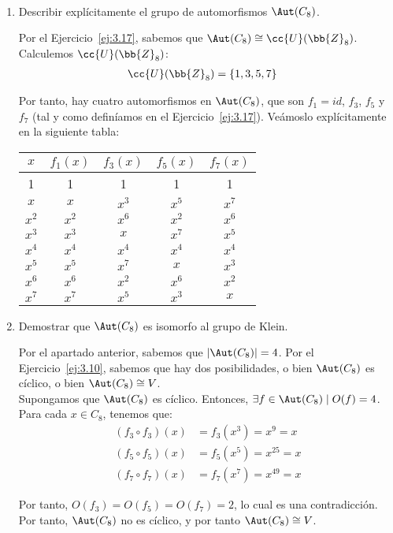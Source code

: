 \begin{ejercicio}\label{ej:3.18}~
    \begin{enumerate}
        \item Describir explícitamente el grupo de automorfismos $\Aut(C_8)$.
        
        Por el Ejercicio~\ref{ej:3.17}, sabemos que $\Aut(C_8)\cong \cc{U}(\bb{Z}_8)$. Calculemos $\cc{U}(\bb{Z}_8)$:
        \begin{align*}
            \cc{U}(\bb{Z}_8) &= \{1,3,5,7\}
        \end{align*}

        Por tanto, hay cuatro automorfismos en $\Aut(C_8)$, que son $f_1=id$, $f_3$, $f_5$ y $f_7$ (tal y como definíamos en el Ejercicio~\ref{ej:3.17}). Veámoslo explícitamente en la siguiente tabla:
        \begin{table}[H]
            \centering
            \begin{tabular}{c|c|c|c|c}
                $x$ & $f_1(x)$ & $f_3(x)$ & $f_5(x)$ & $f_7(x)$\\
                \hline
                1 & 1 & 1 & 1 & 1\\
                $x$ & $x$ & $x^3$ & $x^5$ & $x^7$\\
                $x^2$ & $x^2$ & $x^6$ & $x^2$ & $x^6$\\
                $x^3$ & $x^3$ & $x$ & $x^7$ & $x^5$\\
                $x^4$ & $x^4$ & $x^4$ & $x^4$ & $x^4$\\
                $x^5$ & $x^5$ & $x^7$ & $x$ & $x^3$\\
                $x^6$ & $x^6$ & $x^2$ & $x^6$ & $x^2$\\
                $x^7$ & $x^7$ & $x^5$ & $x^3$ & $x$
            \end{tabular}
        \end{table}
        
        \item Demostrar que $\Aut(C_8)$ es isomorfo al grupo de Klein.
        
        Por el apartado anterior, sabemos que $|\Aut(C_8)|=4$. Por el Ejercicio~\ref{ej:3.10}, sabemos que hay dos posibilidades, o bien $\Aut(C_8)$ es cíclico, o bien $\Aut(C_8)\cong V$.\\

        Supongamos que $\Aut(C_8)$ es cíclico. Entonces, $\exists f\in \Aut(C_8)\mid O(f)=4$. Para cada $x\in C_8$, tenemos que:
        \begin{align*}
            (f_3\circ f_3)(x)&=f_3(x^3)=x^9=x\\
            (f_5\circ f_5)(x)&=f_5(x^5)=x^{25}=x\\
            (f_7\circ f_7)(x)&=f_7(x^7)=x^{49}=x
        \end{align*}

        Por tanto, $O(f_3)=O(f_5)=O(f_7)=2$, lo cual es una contradicción. Por tanto, $\Aut(C_8)$ no es cíclico, y por tanto $\Aut(C_8)\cong V$.
    \end{enumerate}
\end{ejercicio}